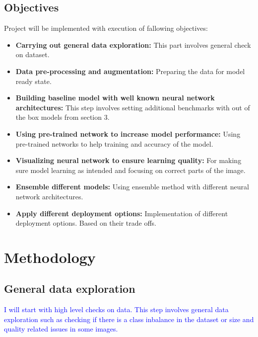 \documentclass[12pt, twoside, a4paper]{article}
\begin{document}
\subsection{Objectives}
Project will be implemented with execution of fallowing objectives:
\begin{itemize}
    \color{blue}
    \item \textbf{Carrying out general data exploration: }This part involves general check on dataset.
    \item \textbf{Data pre-processing and augmentation: }Preparing the data for model ready state.
    \item \textbf{Building baseline model with well known neural network architectures: }This step involves setting additional benchmarks with out of the box models from section 3.
    \item \textbf{Using pre-trained network to increase model performance: }Using pre-trained networks to help training and accuracy of the model.
    \item \textbf{Visualizing neural network to ensure learning quality: } For making sure model learning as intended and focusing on correct parts of the image.
    \item \textbf{Ensemble different models: }Using ensemble method with different neural network architectures.
    \item \textbf{Apply different deployment options: } Implementation of different deployment options. Based on their trade offs. 
\end{itemize}
\clearpage


\section{Methodology}
\subsection{General data exploration}
\textcolor{blue}{I will start with high level checks on data. This step involves general data exploration such as checking if there is a class inbalance in the dataset or size and quality related issues in some images.}
\end{document}
